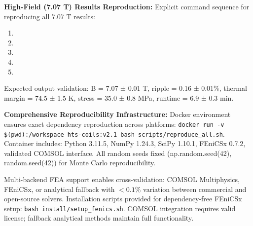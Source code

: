 \documentclass[10pt,twocolumn]{article}
\begin{document}
			\textbf{High-Field (7.07 T) Results Reproduction:} Explicit command sequence for reproducing all 7.07 T results:
{\scriptsize\raggedright
\begin{enumerate}
\item \begin{minipage}[t]{\columnwidth}\ttfamily{}\end{minipage}
\item \begin{minipage}[t]{\columnwidth}\ttfamily{}\end{minipage}
\item \begin{minipage}[t]{\columnwidth}\ttfamily{}\end{minipage}
\item \begin{minipage}[t]{\columnwidth}\ttfamily{}\end{minipage}
\item \begin{minipage}[t]{\columnwidth}\ttfamily{}\end{minipage}
\end{enumerate}
}

Expected output validation: B = 7.07 ± 0.01 T, ripple = 0.16 ± 0.01\%, thermal margin = 74.5 ± 1.5 K, stress = 35.0 ± 0.8 MPa, runtime = 6.9 ± 0.3 min.

\textbf{Comprehensive Reproducibility Infrastructure:} Docker environment ensures exact dependency reproduction across platforms: \texttt{docker run -v \$(pwd):/workspace hts-coils:v2.1 bash scripts/reproduce\_all.sh}. Container includes: Python 3.11.5, NumPy 1.24.3, SciPy 1.10.1, FEniCSx 0.7.2, validated COMSOL interface. All random seeds fixed (np.random.seed(42), random.seed(42)) for Monte Carlo reproducibility.

Multi-backend FEA support enables cross-validation: COMSOL Multiphysics, FEniCSx, or analytical fallback with $<0.1\%$ variation between commercial and open-source solvers. Installation scripts provided for dependency-free FEniCSx setup: \texttt{bash install/setup\_fenics.sh}. COMSOL integration requires valid license; fallback analytical methods maintain full functionality.
\end{document}

